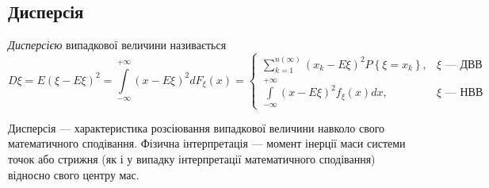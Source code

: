 \subsection{Дисперсія}
\begin{definition}
    \emph{Дисперсією} випадкової величини називається 
    \begin{equation}\label{eq:d_xi}
        D\xi = E\left(\xi-E\xi\right)^2 = \int\limits_{-\infty}^{+\infty} \left(x-E\xi\right)^2 dF_\xi(x) = \begin{cases}
            \sum\limits_{k=1}^{n(\infty)} \left(x_k-E\xi\right)^2 P\left\{\xi = x_k\right\}, & \xi \text{ --- ДВВ} \\
            \int\limits_{-\infty}^{+\infty} \left(x-E\xi\right)^2 f_\xi(x)dx, & \xi \text{ --- НВВ}
        \end{cases}
    \end{equation}
\end{definition}
Дисперсія --- характеристика розсіювання випадкової величини навколо свого математичного сподівання.
Фізична інтерпретація --- момент інерції маси системи точок або стрижня (як і у випадку інтерпретації математичного сподівання)
відносно свого центру мас.

